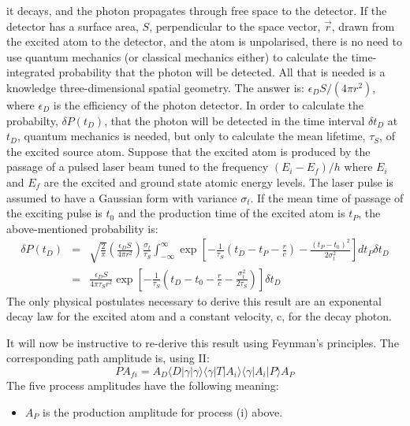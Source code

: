 {     it decays, and the photon propagates through free space to the detector. If the detector
     has a surface area, $S$, perpendicular to the  space vector, $\vec{r}$, drawn from the 
     excited atom to the detector, and the atom is unpolarised, there is no need to 
     use quantum mechanics (or classical mechanics either) to calculate the time-integrated
     probability that the photon will be detected. All that is needed is a knowledge
   three-dimensional spatial geometry. The answer is: $\epsilon_D S/(4 \pi r^2)$, where 
   $\epsilon_D$ is the efficiency of the photon detector. In order to calculate the 
   probabilty, $ \delta P(t_D)$, that the photon will be detected in the time
      interval $\delta t_D$ at $t_D$,
    quantum mechanics is needed, but only to calculate the mean lifetime, $\tau_S$, of the
    excited source atom. Suppose that the excited atom is produced by the passage
   of a pulsed laser beam tuned to the frequency $(E_i-E_f)/h$ where $E_i$ and $E_f$ are the
    excited and ground state atomic energy levels. The laser pulse is assumed to have a
     Gaussian form with variance $\sigma_t$. If the mean time of passage of the exciting
    pulse is $t_0$ and the production time of the excited atom is $t_P$, the above-mentioned probability is: 
 \begin{eqnarray}
  \delta P(t_D) & = & \sqrt{\frac{2}{\pi}}\left( \frac{\epsilon_D S}{4 \pi r^2}\right)
    \frac{\sigma_t}{\tau_S}\int_{-\infty}^{\infty} 
    \exp\left[-\frac{1}{\tau_S}(t_D-t_P-\frac{r}{c}) - \frac{(t_P-t_0)^2}{2\sigma_t^2}\right]
     dt_P \delta t_D  \nonumber \\
    & = & \frac{\epsilon_D S}{4 \pi \tau_S r^2}
     \exp\left[-\frac{1}{\tau_S}(t_D -t_0-\frac{r}{c}-\frac{\sigma_t^2}{2\tau_S})\right]
       \delta t_D 
  \end{eqnarray}
   The only physical postulates necessary to derive this result are an exponental decay law
   for the excited atom and a constant velocity, c, for the decay photon.
   \par It will now be instructive to re-derive this result using Feynman's principles.
    The corresponding path amplitude is, using II:
  \begin{equation}
    PA_{fi} = A_D \langle D|\gamma|\gamma\rangle\langle\gamma|T|A_i\rangle\langle\gamma|A_i|P\rangle A_P
   \end{equation}
    The five process amplitudes have the following meaning:
    \begin{itemize}
   \item $A_P$ is the production amplitude for process (i) above.

\end{itemize}}
